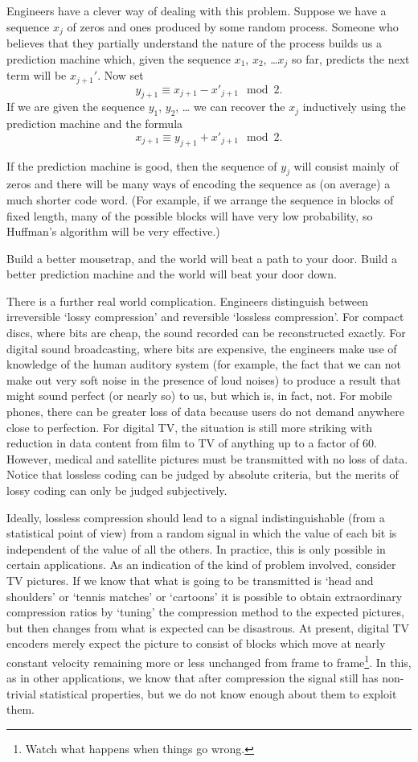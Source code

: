 \documentclass[12pt,a4paper]{article}
\theoremstyle{plain}
\theoremstyle{definition}
\begin{document}
Engineers have a clever way of dealing with this problem.
Suppose we have a sequence $x_{j}$ of zeros and ones
produced by some random process. Someone who believes that
they partially understand the nature of the process
builds us a prediction machine
which, given the sequence $x_{1}$, $x_{2}$, \dots $x_{j}$ so far,
predicts the next term will be $x_{j+1}'$. Now set
\[y_{j+1}\equiv x_{j+1}-x'_{j+1}\mod 2.\]
If we are given the sequence $y_{1}$, $y_{2}$, \dots
we can recover the $x_{j}$ inductively using the
prediction machine and the formula
\[x_{j+1}\equiv y_{j+1}+x'_{j+1}\mod 2.\]

If the prediction machine is good, then the
sequence of $y_{j}$ will consist mainly of zeros
and there will be many ways of encoding the sequence 
as (on average) a much shorter code word.
(For example, if we arrange the sequence in blocks of 
fixed length, many of the possible blocks will have very low 
probability, so Huffman's algorithm will be very effective.)


Build a better mousetrap, and the world will beat a path to your door.
Build a better prediction machine and the world will beat your door down.

There is a further real world complication.
Engineers
distinguish between irreversible
`lossy compression'
and reversible `lossless compression'.
For compact discs, where bits are cheap,
the sound recorded can be reconstructed
exactly. For digital sound broadcasting, where
bits are expensive, the engineers make use
of knowledge of the human auditory system
(for example, the fact that we can not
make out very soft noise in the presence
of loud noises) to produce a result that might
sound perfect (or nearly so) to us, but which
is, in fact, not. For mobile phones, there can be
greater loss of data because users
do not demand anywhere close to 
perfection.
For digital TV, the situation is still more
striking with reduction in data content from
film to TV of anything up to a factor of  60.
However, medical and satellite pictures must
be transmitted with no loss of data.
Notice that lossless coding can be judged by
absolute criteria, but the merits of lossy
coding can only be judged subjectively.

Ideally, lossless compression should
lead to a signal indistinguishable (from a statistical
point of view) from a random signal
in which the value of each bit is independent
of the value of all the others.
In practice, this is only possible in certain
applications. As an indication of the kind of
problem involved, consider TV pictures. If
we know that what is going to be transmitted is
`head and shoulders' or `tennis matches' or
`cartoons' it is possible to obtain extraordinary
compression ratios by `tuning' the compression method
to the expected pictures, but then changes from
what is expected can be disastrous. At present,
digital TV encoders merely expect the picture to
consist of blocks which move at nearly constant
velocity remaining more or less unchanged from
frame to frame\footnote{Watch what happens when
things go wrong.}. In this, as in other applications,
we know that after compression
the signal still has non-trivial
statistical properties, 
but we do not know
enough about them to exploit them.
\end{document}
